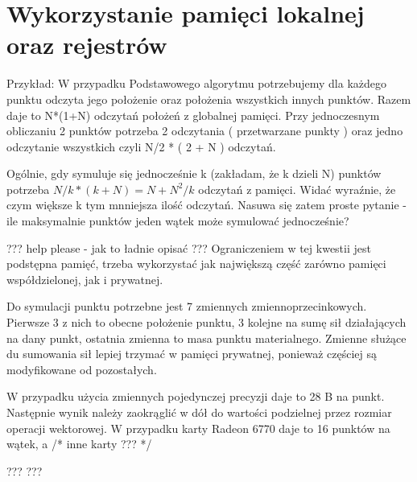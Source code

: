 
\section { Wykorzystanie pamięci lokalnej oraz rejestrów }




Przykład:
W przypadku Podstawowego algorytmu potrzebujemy dla każdego punktu odczyta jego położenie oraz położenia wszystkich innych punktów. Razem daje to N*(1+N) odczytań położeń z globalnej pamięci. Przy jednoczesnym obliczaniu 2 punktów potrzeba 2 odczytania ( przetwarzane punkty ) oraz jedno odczytanie wszystkich czyli N/2  * ( 2 + N ) odczytań.

Ogólnie, gdy symuluje się jednocześnie k (zakładam, że k dzieli N) punktów potrzeba $N/k * (k + N) = N + N^2/k$ odczytań z pamięci. Widać wyraźnie, że czym większe k tym mnniejsza ilość odczytań. Nasuwa się zatem proste pytanie - ile maksymalnie punktów jeden wątek może symulować jednocześnie? \linebreak


??? help please - jak to ładnie opisać ??? \linebreak
Ograniczeniem w tej kwestii jest podstępna pamięć, trzeba wykorzystać jak największą część zarówno pamięci współdzielonej, jak i prywatnej. \linebreak


Do symulacji punktu potrzebne jest 7 zmiennych zmiennoprzecinkowych. Pierwsze 3 z nich to obecne położenie punktu, 3 kolejne na sumę sił działających na dany punkt, ostatnia zmienna to masa punktu materialnego. Zmienne służące du sumowania sił lepiej trzymać w pamięci prywatnej, ponieważ częściej są modyfikowane od pozostałych. 


W przypadku użycia zmiennych pojedynczej precyzji daje to 28 B na punkt. Następnie wynik należy zaokrąglić w dół do wartości podzielnej przez rozmiar operacji wektorowej. W przypadku karty Radeon 6770 daje to 16 punktów na wątek, a /* inne karty ??? */

??? ??? \linebreak



